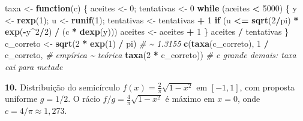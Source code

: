 \documentclass[
  portuguese,
  11pt,
  openany]{book}
\newenvironment{Shaded}{\begin{snugshade}}{\end{snugshade}}
\newcommand{\CommentTok}[1]{\textcolor[rgb]{0.56,0.35,0.01}{\textit{#1}}}
\newcommand{\ControlFlowTok}[1]{\textcolor[rgb]{0.13,0.29,0.53}{\textbf{#1}}}
\newcommand{\DecValTok}[1]{\textcolor[rgb]{0.00,0.00,0.81}{#1}}
\newcommand{\FunctionTok}[1]{\textcolor[rgb]{0.13,0.29,0.53}{\textbf{#1}}}
\newcommand{\NormalTok}[1]{#1}
\newcommand{\OtherTok}[1]{\textcolor[rgb]{0.56,0.35,0.01}{#1}}
\newcommand{\SpecialCharTok}[1]{\textcolor[rgb]{0.81,0.36,0.00}{\textbf{#1}}}
\begin{document}
\begin{Shaded}
\begin{Highlighting}[]
\NormalTok{taxa }\OtherTok{\textless{}{-}} \ControlFlowTok{function}\NormalTok{(c) \{}
\NormalTok{  aceites }\OtherTok{\textless{}{-}} \DecValTok{0}\NormalTok{; tentativas }\OtherTok{\textless{}{-}} \DecValTok{0}
  \ControlFlowTok{while}\NormalTok{ (aceites }\SpecialCharTok{\textless{}} \DecValTok{5000}\NormalTok{) \{}
\NormalTok{    y }\OtherTok{\textless{}{-}} \FunctionTok{rexp}\NormalTok{(}\DecValTok{1}\NormalTok{); u }\OtherTok{\textless{}{-}} \FunctionTok{runif}\NormalTok{(}\DecValTok{1}\NormalTok{); tentativas }\OtherTok{\textless{}{-}}\NormalTok{ tentativas }\SpecialCharTok{+} \DecValTok{1}
    \ControlFlowTok{if}\NormalTok{ (u }\SpecialCharTok{\textless{}=} \FunctionTok{sqrt}\NormalTok{(}\DecValTok{2}\SpecialCharTok{/}\NormalTok{pi) }\SpecialCharTok{*} \FunctionTok{exp}\NormalTok{(}\SpecialCharTok{{-}}\NormalTok{y}\SpecialCharTok{\^{}}\DecValTok{2}\SpecialCharTok{/}\DecValTok{2}\NormalTok{) }\SpecialCharTok{/}\NormalTok{ (c }\SpecialCharTok{*} \FunctionTok{dexp}\NormalTok{(y))) aceites }\OtherTok{\textless{}{-}}\NormalTok{ aceites }\SpecialCharTok{+} \DecValTok{1}
\NormalTok{  \}}
\NormalTok{  aceites }\SpecialCharTok{/}\NormalTok{ tentativas}
\NormalTok{\}}
\NormalTok{c\_correto }\OtherTok{\textless{}{-}} \FunctionTok{sqrt}\NormalTok{(}\DecValTok{2} \SpecialCharTok{*} \FunctionTok{exp}\NormalTok{(}\DecValTok{1}\NormalTok{) }\SpecialCharTok{/}\NormalTok{ pi)   }\CommentTok{\# \textasciitilde{} 1.3155}
\FunctionTok{c}\NormalTok{(}\FunctionTok{taxa}\NormalTok{(c\_correto), }\DecValTok{1} \SpecialCharTok{/}\NormalTok{ c\_correto,    }\CommentTok{\# empírica \textasciitilde{} teórica}
  \FunctionTok{taxa}\NormalTok{(}\DecValTok{2} \SpecialCharTok{*}\NormalTok{ c\_correto))               }\CommentTok{\# c grande demais: taxa cai para metade}
\end{Highlighting}
\end{Shaded}

\textbf{10.} Distribuição do semicírculo \(f(x) = \tfrac{2}{\pi}\sqrt{1 - x^2}\) em
\([-1, 1]\), com proposta uniforme \(g = 1/2\). O rácio \(f/g = \tfrac{4}{\pi}\sqrt{1-x^2}\)
é máximo em \(x = 0\), onde \(c = 4/\pi \approx 1{,}273\).
\end{document}
